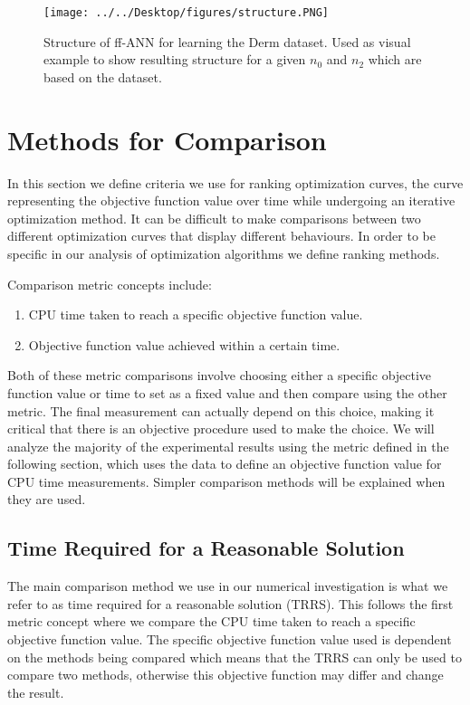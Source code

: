 \documentclass[letterpaper,12pt,titlepage,oneside,final]{book}
\begin{document}
	
	\begin{figure}[h]
		\centering
		\texttt{[image: ../../Desktop/figures/structure.PNG]}
		\caption{Structure of ff-ANN for learning the Derm dataset. Used as visual example to show resulting structure for a given $n_{0}$ and $n_{2}$ which are based on the dataset.}
		\label{figure:structure}
	\end{figure}

	
	\section{Methods for Comparison}
	
	In this section we define criteria we use for ranking optimization curves, the curve representing the objective function value over time while undergoing an iterative optimization method. It can be difficult to make comparisons between two different optimization curves that display different behaviours. In order to be specific in our analysis of optimization algorithms we define ranking methods. 
	
	Comparison metric concepts include:
	\begin{enumerate}
		\item CPU time taken to reach a specific objective function value.
		\item Objective function value achieved within a certain time.
	\end{enumerate}
	
	Both of these metric comparisons involve choosing either a specific objective function value or time to set as a fixed value and then compare using the other metric. The final measurement can actually depend on this choice, making it critical that there is an objective procedure used to make the choice. We will analyze the majority of the experimental results using the metric defined in the following section, which uses the data to define an objective function value for CPU time measurements. Simpler comparison methods will be explained when they are used.
	
	\subsection{Time Required for a Reasonable Solution}
	
	The main comparison method we use in our numerical investigation is what we refer to as time required for a reasonable solution (TRRS). This follows the first metric concept where we compare the CPU time taken to reach a specific objective function value. The specific objective function value used is dependent on the methods being compared which means that the TRRS can only be used to compare two methods, otherwise this objective function may differ and change the result. 
	
\end{document}
